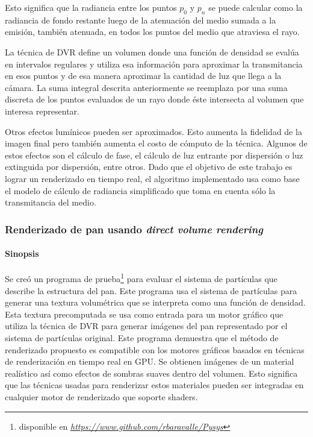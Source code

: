 \documentclass[oneside,a4paper,spanish,links]{amca}
\begin{document}
Esto significa que la radiancia entre los puntos $p_0$ y
$p_n$ se puede calcular como la radiancia de fondo restante luego de
la atenuación del medio sumada a la emisión, también atenuada, en todos
los puntos del medio que atraviesa el rayo.

La técnica de DVR define un volumen donde una función de densidad se
evalúa en intervalos regulares y utiliza esa información para
aproximar la transmitancia en esos puntos y de esa manera aproximar la
cantidad de luz que llega a la cámara. La suma integral descrita
anteriormente se reemplaza por una suma discreta de los puntos
evaluados de un rayo donde \'este intersecta al volumen que interesa
representar. 

Otros efectos lumínicos pueden ser aproximados. Esto aumenta la
fidelidad de la imagen final pero también aumenta el costo de cómputo
de la técnica. Algunos de estos efectos son el cálculo de fase, el c\'alculo de
luz entrante por dispersión o luz extinguida por dispersión, entre
otros. Dado que el objetivo de este trabajo es lograr un renderizado
en tiempo real, el algoritmo implementado usa como base el modelo de
cálculo de radiancia simplificado que toma en cuenta sólo la
transmitancia del medio.

\subsubsection{Renderizado de pan usando \emph{direct volume rendering}}

\paragraph{Sinopsis}

Se cre\'o un programa de prueba\footnote{disponible en
  \emph{\url{https://www.github.com/rbaravalle/Pysys}}} para evaluar
el sistema de partículas que describe la estructura del pan. Este
programa usa el sistema de partículas para generar una textura
volumétrica que se interpreta como una función de densidad. Esta
textura precomputada se usa como entrada para un motor gráfico que utiliza la
técnica de DVR para generar imágenes del pan representado por el
sistema de partículas original. Este programa demuestra que el método
de renderizado propuesto es compatible con los motores gráficos
basados en técnicas de renderización en tiempo real en GPU. Se
obtienen imágenes de un material realístico así como efectos de
sombras suaves dentro del volumen. Esto significa que las técnicas
usadas para renderizar estos materiales pueden ser integradas en
cualquier motor de renderizado que soporte shaders.
\end{document}
